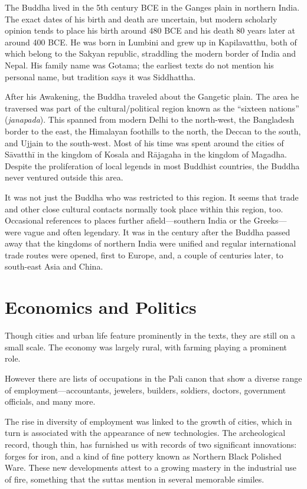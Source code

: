 \documentclass[12pt,openany]{book}%
\begin{document}
The Buddha lived in the 5th century BCE in the Ganges plain in northern India. The exact dates of his birth and death are uncertain, but modern scholarly opinion tends to place his birth around 480 BCE and his death 80 years later at around 400 BCE. He was born in Lumbini and grew up in Kapilavatthu, both of which belong to the Sakyan republic, straddling the modern border of India and Nepal. His family name was Gotama; the earliest texts do not mention his personal name, but tradition says it was Siddhattha.

After his Awakening, the Buddha traveled about the Gangetic plain. The area he traversed was part of the cultural/political region known as the “sixteen nations” (\textit{janapada}). This spanned from modern Delhi to the north-west, the Bangladesh border to the east, the Himalayan foothills to the north, the Deccan to the south, and Ujjain to the south-west. Most of his time was spent around the cities of \textsanskrit{Sāvatthī} in the kingdom of Kosala and \textsanskrit{Rājagaha} in the kingdom of Magadha. Despite the proliferation of local legends in most Buddhist countries, the Buddha never ventured outside this area.

It was not just the Buddha who was restricted to this region. It seems that trade and other close cultural contacts normally took place within this region, too. Occasional references to places further afield—southern India or the Greeks—were vague and often legendary. It was in the century after the Buddha passed away that the kingdoms of northern India were unified and regular international trade routes were opened, first to Europe, and, a couple of centuries later, to south-east Asia and China.

\section*{Economics and Politics}

Though cities and urban life feature prominently in the texts, they are still on a small scale. The economy was largely rural, with farming playing a prominent role.

However there are lists of occupations in the Pali canon that show a diverse range of employment—accountants, jewelers, builders, soldiers, doctors, government officials, and many more.

The rise in diversity of employment was linked to the growth of cities, which in turn is associated with the appearance of new technologies. The archeological record, though thin, has furnished us with records of two significant innovations: forges for iron, and a kind of fine pottery known as Northern Black Polished Ware. These new developments attest to a growing mastery in the industrial use of fire, something that the suttas mention in several memorable similes.
\end{document}
